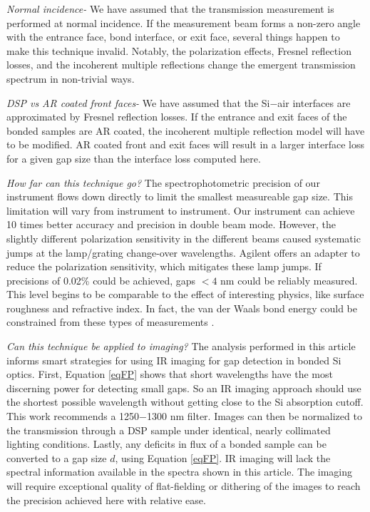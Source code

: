 \emph{Normal incidence- } We have assumed that the transmission measurement is performed at normal incidence.  If the measurement beam forms a non-zero angle with the entrance face, bond interface, or exit face, several things happen to make this technique invalid.  Notably, the polarization effects, Fresnel reflection losses, and the incoherent multiple reflections change the emergent transmission spectrum in non-trivial ways.

\emph{DSP vs AR coated front faces- } We have assumed that the Si$-$air interfaces are approximated by Fresnel reflection losses.  If the entrance and exit faces of the bonded samples are AR coated, the incoherent multiple reflection model will have to be modified.  AR coated front and exit faces will result in a larger interface loss for a given gap size than the interface loss computed here.

\emph{How far can this technique go?}  The spectrophotometric precision of our instrument flows down directly to limit the smallest measureable gap size.  This limitation will vary from instrument to instrument.  Our instrument can achieve 10 times better accuracy and precision in double beam mode.  However, the slightly different polarization sensitivity in the different beams caused systematic jumps at the lamp/grating change-over wavelengths.  Agilent offers an adapter to reduce the polarization sensitivity, which mitigates these lamp jumps.  If precisions of 0.02\% could be achieved, gaps $<4$ nm could be reliably measured.  This level begins to be comparable to the effect of interesting physics, like surface roughness and refractive index.  In fact, the van der Waals bond energy could be constrained from these types of measurements \cite{2001JOptA...3...85G}.

\emph{Can this technique be applied to imaging?}  The analysis performed in this article informs smart strategies for using IR imaging for gap detection in bonded Si optics.  First, Equation \ref{eqFP} shows that short wavelengths have the most discerning power for detecting small gaps.  So an IR imaging approach should use the shortest possible wavelength without getting close to the Si absorption cutoff.  This work recommends a 1250$-$1300 nm filter.  Images can then be normalized to the transmission through a DSP sample under identical, nearly collimated lighting conditions.  Lastly, any deficits in flux of a bonded sample can be converted to a gap size $d$, using Equation \ref{eqFP}.  IR imaging will lack the spectral information available in the spectra shown in this article.  The imaging will require exceptional quality of flat-fielding or dithering of the images to reach the precision achieved here with relative ease.  

